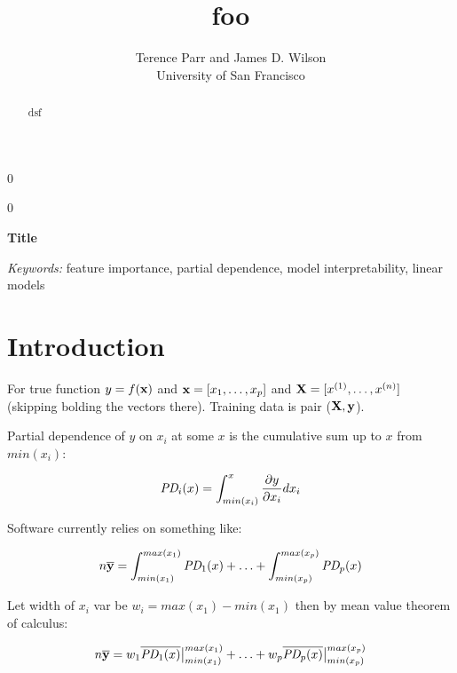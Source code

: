 \documentclass[12pt]{article}
\newcommand{\blind}{0}
\begin{document}
\def\spacingset#1{\renewcommand{\baselinestretch}%
{#1}\small\normalsize} \spacingset{1}



\blind
{
  \title{\bf foo}

  \author{Terence Parr and James D. Wilson\\
      University of San Francisco\\
}
  \maketitle
} \fi

\blind
{
  \bigskip
  \bigskip
  \bigskip
  \begin{center}
    {\LARGE\bf Title}
\end{center}
  \medskip
} \fi

\bigskip
\begin{abstract}
dsf
\end{abstract}

\noindent%
{\it Keywords:} feature importance, partial dependence, model interpretability, linear models

\section{Introduction}
\label{sec:intro}

For true function $y = f(\bf x)$ and ${\bf x} = [x_1, \ldots, x_p]$ and ${\bf X} = [x^{(1)}, \ldots, x^{(n)}]$ (skipping bolding the vectors there).  Training data is pair ($\bf X, y$).

Partial dependence of $y$ on  $x_i$ at some $x$ is the cumulative sum up to $x$ from $min(x_i)$:

\[
\text{\it PD}_i(x) = \int_{min(x_i)}^x \frac{\partial y}{\partial x_i} dx_i
\]

Software currently relies on something like:

\[
n \overline {\bf y} = \int_{min(x_1)}^{max(x_1)} \text{\it PD}_1(x) + \ldots + \int_{min(x_p)}^{max(x_p)} \text{\it PD}_p(x)
\]

Let width of $x_i$ var be $w_i = max(x_1)-min(x_1)$ then by mean value theorem of calculus:

\[
n \overline {\bf y} = w_1\overline{\text{\it PD}_1(x)}\big |_{min(x_1)}^{max(x_1)} + \ldots + w_p\overline{\text{\it PD}_p(x)}\big |_{min(x_p)}^{max(x_p)}
\]
\end{document}

